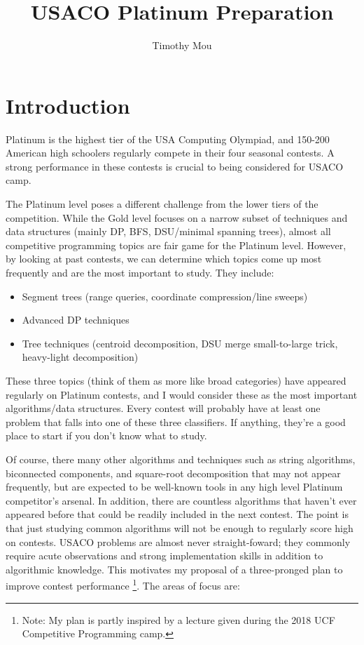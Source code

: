 \documentclass[11pt]{article} %
\title{USACO Platinum Preparation}
\author{Timothy Mou}
\begin{document}
\maketitle

\section{Introduction}
Platinum is the highest tier of the USA Computing Olympiad, and 150-200 American high schoolers regularly compete in their four seasonal contests. A strong performance in these contests is crucial to being considered for USACO camp. 

The Platinum level poses a different challenge from the lower tiers of the competition. While the Gold level focuses on a narrow subset of techniques and data structures (mainly DP, BFS, DSU/minimal spanning trees), almost all competitive programming topics are fair game for the Platinum level. However, by looking at past contests, we can determine which topics come up most frequently and are the most important to study. They include:

\begin{itemize}
\item Segment trees (range queries, coordinate compression/line sweeps)
\item Advanced DP techniques
\item Tree techniques (centroid decomposition, DSU merge small-to-large trick, heavy-light decomposition)
\end{itemize}

These three topics (think of them as more like broad categories) have appeared regularly on Platinum contests, and I would consider these as the most important algorithms/data structures. Every contest will probably have at least one problem that falls into one of these three classifiers. If anything, they're a good place to start if you don't know what to study.  

Of course, there many other algorithms and techniques such as string algorithms, biconnected components, and square-root decomposition that may not appear frequently, but are expected to be well-known tools in any high level Platinum competitor's arsenal. In addition, there are countless algorithms that haven't ever appeared before that could be readily included in the next contest. The point is that just studying common algorithms will not be enough to regularly score high on contests. USACO problems are almost never straight-foward; they commonly require acute observations and strong implementation skills in addition to algorithmic knowledge. This motivates my proposal of a three-pronged plan to improve contest performance \footnote{Note: My plan is partly inspired by a lecture given during the 2018 UCF Competitive Programming camp. }. The areas of focus are:
\end{document}

